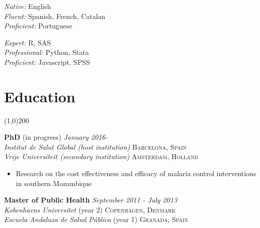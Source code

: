 \documentclass[11pt]{article}
\begin{document}
\begin{multicols}{2}

\noindent \emph{Native:} English\\
\noindent \emph{Fluent:} Spanish, French, Catalan\\
\noindent \emph{Proficient:} Portuguese

\vfill
\columnbreak


\noindent \emph{Expert:} R, SAS\\
\noindent \emph{Professional:} Python, Stata\\
\noindent \emph{Proficient:} Javascript, SPSS


\end{multicols}



\section*{Education} %
\vspace{-7mm}
\line(1,0){200}
\vspace{2mm}

\noindent \textbf{PhD} (in progress) \hfill \emph{January 2016-}\\
\noindent \emph{Institut de Salut Global (host institution)} \hfill \textsc{Barcelona, Spain} \\
\noindent \emph{Vrije Universiteit (secondary institution)} \hfill \textsc{Amsterdam, Holland}

\vspace{-2mm}
\begin{itemize}\itemsep0pt \parskip0pt 
\item Research on the cost effectiveness and efficacy of malaria control interventions in southern Mozambique
\end{itemize}
\noindent \textbf{Master of Public Health} \hfill \emph{September 2011 - July 2013} \\
\noindent \emph{Kobenhavns Universitet} (year 2) \hfill \textsc{Copenhagen, Denmark} \\
\noindent \emph{Escuela Andaluza de Salud Pública} (year 1) \hfill \textsc{Granada, Spain}
\end{document}
